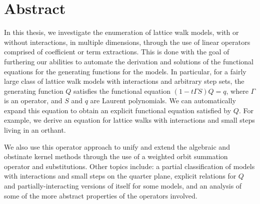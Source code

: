 
\chapter{Abstract}

In this thesis, we investigate the enumeration of lattice walk models, with or without interactions, in multiple dimensions, through the use of linear operators comprised of coefficient or term extractions. This is done with the goal of furthering our abilities to automate the derivation and solutions of the functional equations for the generating functions for the models. In particular, for a fairly large class of \dD lattice walk models with interactions and arbitrary step sets, the generating function $Q$ satisfies the functional equation $(1-t\Gamma S)Q = q$, where $\Gamma$ is an operator, and $S$ and $q$ are Laurent polynomials. We can automatically expand this equation to obtain an explicit functional equation satisfied by $Q$. For example, we derive an equation for \dD lattice walks with interactions and small steps living in an orthant. 

We also use this operator approach to unify and extend the algebraic and obstinate kernel methods through the use of a weighted orbit summation operator and substitutions. Other topics include: a partial classification of \twoD models with interactions and small steps on the quarter plane, explicit relations for $Q$ and partially-interacting versions of itself for some models, and an analysis of some of the more abstract properties of the operators involved.

